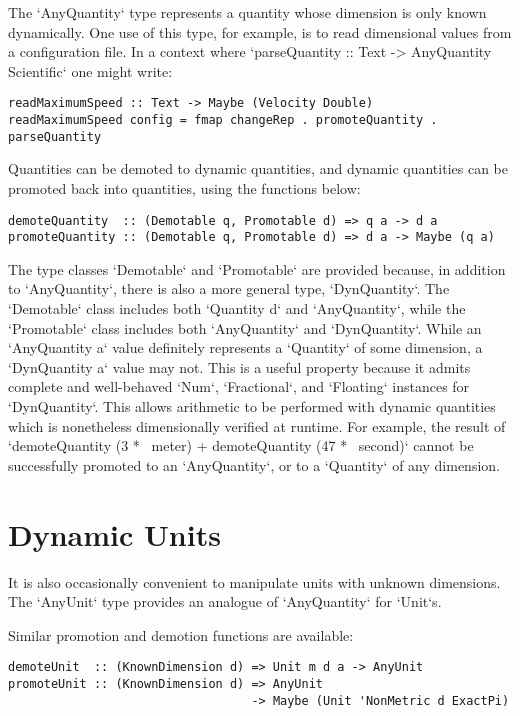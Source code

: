 \documentclass[11pt]{report}
\begin{document}
The `AnyQuantity` type represents a quantity whose dimension is only known dynamically. One use of this
type, for example, is to read dimensional values from a configuration file. In a context where
`parseQuantity :: Text -> AnyQuantity Scientific` one might write:

\begin{lstlisting}
readMaximumSpeed :: Text -> Maybe (Velocity Double)
readMaximumSpeed config = fmap changeRep . promoteQuantity . parseQuantity
\end{lstlisting}

Quantities can be demoted to dynamic quantities, and dynamic quantities can be promoted back into quantities,
using the functions below:

\begin{lstlisting}
demoteQuantity  :: (Demotable q, Promotable d) => q a -> d a
promoteQuantity :: (Demotable q, Promotable d) => d a -> Maybe (q a)
\end{lstlisting}

The type classes `Demotable` and `Promotable` are provided because, in addition to `AnyQuantity`, there is also a more general type, `DynQuantity`. The `Demotable` class includes both `Quantity d` and `AnyQuantity`, while the `Promotable` class includes both `AnyQuantity` and `DynQuantity`.
While an `AnyQuantity a` value definitely represents a `Quantity` of some dimension, a `DynQuantity a` value may not.
This is a useful property because it admits complete and well-behaved `Num`, `Fractional`, and `Floating` instances for `DynQuantity`. This allows
arithmetic to be performed with dynamic quantities which is nonetheless dimensionally verified at runtime. For example,
the result of `demoteQuantity (3 *~ meter) + demoteQuantity (47 *~ second)` cannot be successfully promoted to an
`AnyQuantity`, or to a `Quantity` of any dimension.

\section{Dynamic Units} \label{dynamic-units}

It is also occasionally convenient to manipulate units with unknown dimensions. The `AnyUnit` type provides
an analogue of `AnyQuantity` for `Unit`s.

Similar promotion and demotion functions are available:

\begin{lstlisting}
demoteUnit  :: (KnownDimension d) => Unit m d a -> AnyUnit
promoteUnit :: (KnownDimension d) => AnyUnit
                                  -> Maybe (Unit 'NonMetric d ExactPi)
\end{lstlisting}
\end{document}
